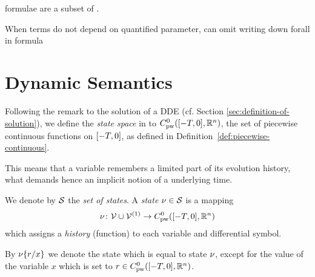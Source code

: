     \FOLR formulae are a subset of \ddL.

    When terms do not depend on quantified parameter, can omit writing down forall in formula

\section{Dynamic Semantics}
    \label{sec:dynamic-semantics}

    Following the remark to the solution of a DDE (cf. Section \ref{sec:definition-of-solution}), we define the \emph{state space} in \ddL to $\statespace$, the set of piecewise continuous functions on $\closeddelayinterval$, as defined in Definition~\ref{def:piecewise-continuous}.

    This means that a variable remembers a limited part of its evolution history, what demands hence an implicit notion of a underlying time.

    We denote by $\states$ the \emph{set of states}. A \emph{state} $\asstate\in\states$ is a mapping
    \begin{equation}
        \asstate \from \allvars\cup\diffvars \to \statespace
    \end{equation}
    which assigns a \emph{history} (function) to each variable and differential symbol.

    By $\modif{\asstate}{x}{r}$ we denote the state which is equal to state $\asstate$, except for the value of the variable $x$ which is set to $r\in\statespace$.



